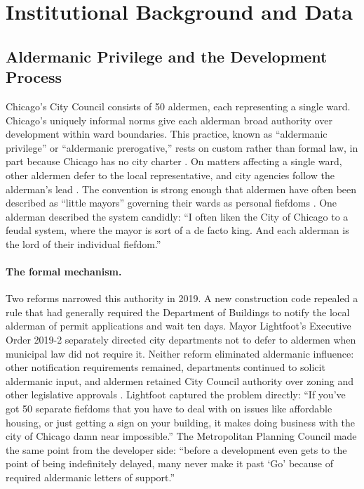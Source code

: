 
\section{Institutional Background and Data}
\label{sec:data}

\subsection{Aldermanic Privilege and the Development Process}
\label{subsec:aldermanic_privilege}

Chicago's City Council consists of 50 aldermen, each representing a single ward.
Chicago's uniquely informal norms give each alderman broad authority over
development within ward boundaries.
This practice, known as ``aldermanic
privilege'' or ``aldermanic prerogative,'' rests on custom rather than formal law, in part because Chicago has no city charter \citep{mcclintock_what_2025}.
On matters affecting a
single ward, other aldermen defer to the local representative, and city agencies
follow the alderman's lead \citep{thale_aldermanic_2005, zhang_boundaries_2011}.
The convention is strong
enough that aldermen have often been described as ``little mayors'' governing
their wards as personal fiefdoms \citep{einhorn_property_1991}.
One alderman
described the system candidly: ``I often liken the City of Chicago to a feudal
system, where the mayor is sort of a de facto king.
And each alderman is the lord
of their individual fiefdom.''
\citep{keefe_pregnancy_2013}

\paragraph{The formal mechanism.}
Two reforms narrowed this authority in 2019.
A new construction code repealed a rule that had generally required the Department of Buildings to notify the local alderman of permit applications and wait ten days.
Mayor Lightfoot's Executive Order 2019-2 separately directed city departments not to defer to aldermen when municipal law did not require it.
Neither reform eliminated aldermanic influence: other notification requirements remained, departments continued to solicit aldermanic input, and aldermen retained City Council authority over zoning and other legislative approvals \citep{city_of_chicago_sixty-day_2019, mayors_press_office_mayor_2019, schutz_lightfoot_2019}.
Lightfoot captured the problem directly: ``If
you've got 50 separate fiefdoms that you have to deal with on issues like affordable
housing, or just getting a sign on your building, it makes doing business with the
city of Chicago damn near impossible.''
\citep{spielman_lightfoot_2019} The Metropolitan Planning Council made the same point from the developer side: ``before a development even gets to the point of being indefinitely
delayed, many never make it past `Go' because of required aldermanic letters of
support.''
\citep{metropolitan_planning_council_unfettered_2019}


